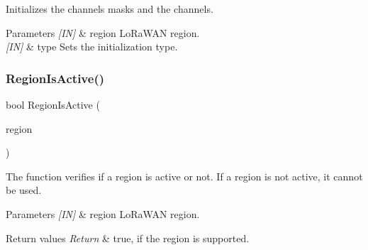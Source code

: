 Initializes the channels masks and the channels. 


\begin{DoxyParams}{Parameters}
{\em \mbox{[}\+I\+N\mbox{]}} & region Lo\+Ra\+W\+AN region.\\
\hline
{\em \mbox{[}\+I\+N\mbox{]}} & type Sets the initialization type. \\
\hline
\end{DoxyParams}
\mbox{\label{group__REGION_ga3e5cf2322f71f8f9973718024b6fb782}} 
\subsubsection{\texorpdfstring{Region\+Is\+Active()}{RegionIsActive()}}
{\footnotesize\ttfamily bool Region\+Is\+Active (\begin{DoxyParamCaption}\item[{\hyperlink{group__LORAMAC_ga80c48efda9ae02e14b58160d34a798dd}{Lo\+Ra\+Mac\+Region\+\_\+t}}]{region }\end{DoxyParamCaption})}



The function verifies if a region is active or not. If a region is not active, it cannot be used. 


\begin{DoxyParams}{Parameters}
{\em \mbox{[}\+I\+N\mbox{]}} & region Lo\+Ra\+W\+AN region.\\
\hline
\end{DoxyParams}

\begin{DoxyRetVals}{Return values}
{\em Return} & true, if the region is supported. \\
\hline
\end{DoxyRetVals}
\mbox{\label{group__REGION_gae82a94e6d4141122e1a20b5ba1936c8e}} 
